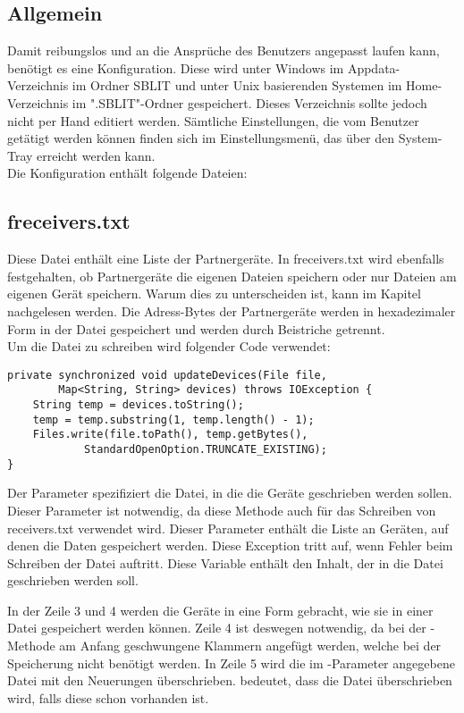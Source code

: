 \subsection{Allgemein}
Damit \sblit reibungslos und an die Ansprüche des Benutzers angepasst laufen kann, benötigt es eine Konfiguration. Diese wird unter Windows im Appdata-Verzeichnis im Ordner SBLIT und unter Unix basierenden Systemen im Home-Verzeichnis im ".SBLIT"-Ordner gespeichert. Dieses Verzeichnis sollte jedoch nicht per Hand editiert werden. Sämtliche Einstellungen, die vom Benutzer getätigt werden können finden sich im Einstellungsmenü, das über den System-Tray erreicht werden kann.\\
Die Konfiguration enthält folgende Dateien:
\subsection{freceivers.txt}
Diese Datei enthält eine Liste der Partnergeräte. In freceivers.txt wird ebenfalls festgehalten, ob Partnergeräte die eigenen Dateien speichern oder nur Dateien am eigenen Gerät speichern. Warum dies zu unterscheiden ist, kann im Kapitel  nachgelesen werden. Die Adress-Bytes der Partnergeräte werden in hexadezimaler Form in der Datei gespeichert und werden durch Beistriche getrennt. \\
Um die Datei zu schreiben wird folgender Code verwendet: \\
\javalisting
\begin{minipage}{\linewidth}
\begin{lstlisting}[caption={Schreiben der Gerätedatei},captionpos=b]
private synchronized void updateDevices(File file,
		Map<String, String> devices) throws IOException {
	String temp = devices.toString();
	temp = temp.substring(1, temp.length() - 1);
	Files.write(file.toPath(), temp.getBytes(),
			StandardOpenOption.TRUNCATE_EXISTING);
}
\end{lstlisting}
\end{minipage}
\begin{description}
	Der Parameter spezifiziert die Datei, in die die Geräte geschrieben werden sollen. Dieser Parameter ist notwendig, da diese Methode auch für das Schreiben von receivers.txt  verwendet wird.
	Dieser Parameter enthält die Liste an Geräten, auf denen die Daten gespeichert werden.
	Diese Exception tritt auf, wenn Fehler beim Schreiben der Datei auftritt.
	Diese Variable enthält den Inhalt, der in die Datei geschrieben werden soll. 
\end{description}
In der Zeile 3 und 4 werden die Geräte in eine Form gebracht, wie sie in einer Datei gespeichert werden können. Zeile 4 ist deswegen notwendig, da bei der -Methode am Anfang geschwungene Klammern angefügt werden, welche bei der Speicherung nicht benötigt werden. In Zeile 5 wird die im -Parameter angegebene Datei mit den Neuerungen überschrieben.  bedeutet, dass die Datei überschrieben wird, falls diese schon vorhanden ist.

